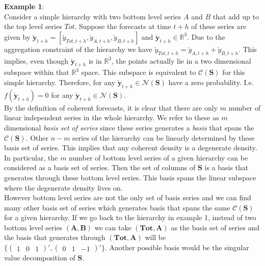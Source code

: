 \documentclass[a4paper, 11pt]{article}
\begin{document}
\noindent
\textbf{Example 1}:\\

\noindent
Consider a simple hierarchy with two bottom level series $A$ and $B$ that add up to the top level series $Tot$. Suppose the forecasts at time $t+h$ of these series are given by $\mathbold{\breve{y}}_{t+h} = [\breve{y}_{Tot,t+h},\breve{y}_{A,t+h}, \breve{y}_{B,t+h}]$ and $\mathbold{\breve{y}}_{t+h} \in \bm{\mathbb{R}}^3$. Due to the aggregation constraint of the hierarchy we have $\breve{y}_{Tot,t+h}=\breve{y}_{A,t+h}+\breve{y}_{B,t+h}$. This implies, even though  $\mathbold{\breve{y}}_{t+h}$ is in $\bm{\mathbb{R}}^3$, the points actually lie in a two dimensional subspace within that $\bm{\mathbb{R}}^3$ space. This subspace is equivalent to $\mathscr{C}(\bm{S})$ for this simple hierarchy. Therefore, for any $\mathbold{\breve{y}}_{t+h} \in \mathscr{N}(\bm{S})$ have a zero probability. I.e. $f(\mathbold{\breve{y}}_{t+h})=0$ for any $\mathbold{\breve{y}}_{t+h} \in \mathscr{N}(\bm{S})$.\\

\noindent
By the definition of coherent forecasts, it is clear that there are only $m$ number of linear independent series in the whole hierarchy. We refer to these as $m$ dimensional \textit{basis set of series} since these series generates a \textit{basis} that spans the $\mathscr{C}(\bm{S})$. Other $n-m$ series of the hierarchy can be linearly determined by these basis set of series. This implies that any coherent density is a degenerate density. In particular, the $m$ number of bottom level series of a given hierarchy can be considered as a basis set of series. Then the set of columns of $\bm{S}$ is a basis that generates through these bottom level series. This basis spans the linear subspace where the degenerate density lives on.\\

\noindent
However bottom level series are not the only set of basis series and we can find many other basis set of series which generates basis that spans the same $\mathscr{C}(\bm{S})$ for a given hierarchy. If we go back to the hierarchy in example 1, instead of two bottom level series $(\bm{A,B})$ we can take $(\bm{Tot,A})$ as the basis set of series and the basis that generates through $(\bm{Tot,A})$ will be $\{\begin{pmatrix}
1&0&1 \end{pmatrix}', \begin{pmatrix}
0&1&-1 \end{pmatrix}'\}$. Another possible basis would be the singular value decomposition of $\bm{S}$.\\
\end{document}
